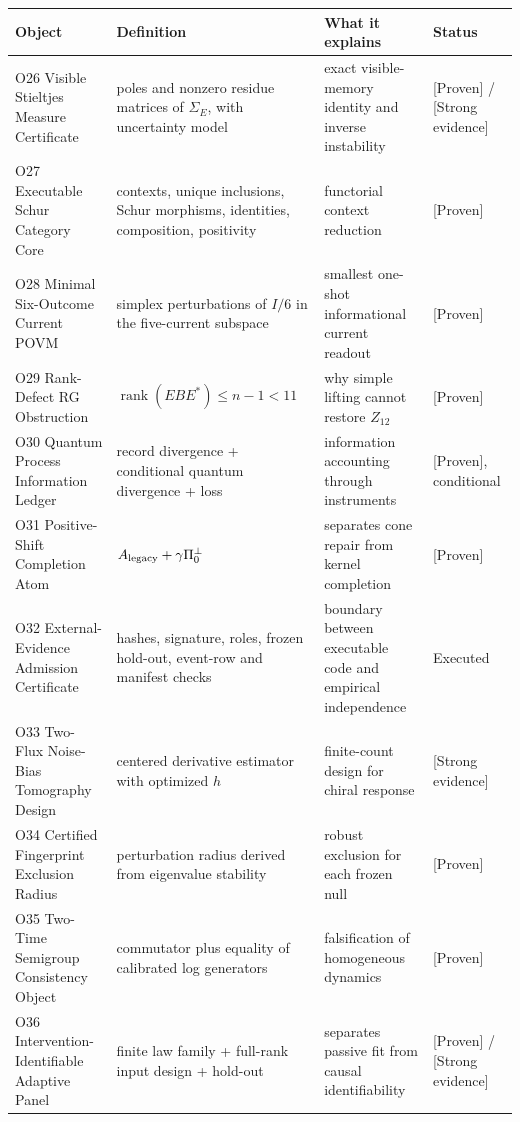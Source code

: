 \documentclass[11pt,a4paper,openany]{report}
\newcommand{\statusProven}{\textcolor{fingreen}{[Proven]}}
\newcommand{\statusStrong}{\textcolor{finblue}{[Strong evidence]}}
\begin{document}
\begin{center}
\begingroup\small
\setlength{\tabcolsep}{2.5pt}
\renewcommand{\arraystretch}{1.16}
\begin{longtable}{@{}p{}p{}p{}p{}@{}}
\toprule
\textbf{Object} & \textbf{Definition} & \textbf{What it explains} & \textbf{Status} \\
\midrule
\endhead
O26 Visible Stieltjes Measure Certificate & poles and nonzero residue matrices of \(\Sigma_E\), with uncertainty model & exact visible-memory identity and inverse instability & \statusProven{} /\allowbreak{} \statusStrong{} \\
O27 Executable Schur Category Core & contexts, unique inclusions, Schur morphisms, identities, composition, positivity & functorial context reduction & \statusProven{} \\
O28 Minimal Six-Outcome Current POVM & simplex perturbations of \(I/6\) in the five-current subspace & smallest one-shot informational current readout & \statusProven{} \\
O29 Rank-Defect RG Obstruction & \(\operatorname{rank}(EBE^\ast)\le n-1<11\) & why simple lifting cannot restore \(Z_{12}\) & \statusProven{} \\
O30 Quantum Process Information Ledger & record divergence + conditional quantum divergence + loss & information accounting through instruments & \statusProven{}, conditional \\
O31 Positive-Shift Completion Atom & \(A_{\rm legacy}+\gamma\Pi_0^\perp\) & separates cone repair from kernel completion & \statusProven{} \\
O32 External-Evidence Admission Certificate & hashes, signature, roles, frozen hold-out, event-row and manifest checks & boundary between executable code and empirical independence & Executed \\
O33 Two-Flux Noise-Bias Tomography Design & centered derivative estimator with optimized \(h\) & finite-count design for chiral response & \statusStrong{} \\
O34 Certified Fingerprint Exclusion Radius & perturbation radius derived from eigenvalue stability & robust exclusion for each frozen null & \statusProven{} \\
O35 Two-Time Semigroup Consistency Object & commutator plus equality of calibrated log generators & falsification of homogeneous dynamics & \statusProven{} \\
O36 Intervention-Identifiable Adaptive Panel & finite law family + full-rank input design + hold-out & separates passive fit from causal identifiability & \statusProven{} /\allowbreak{} \statusStrong{} \\

\end{longtable}
\end{center}
\end{document}
